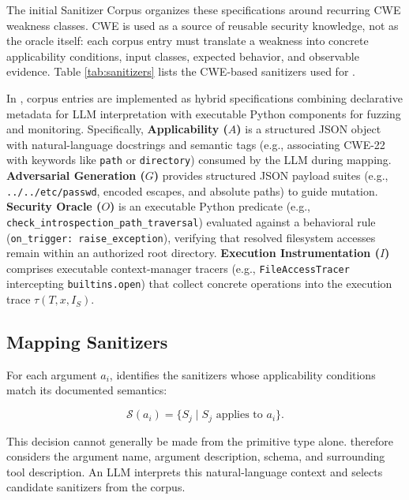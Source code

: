 The initial Sanitizer Corpus organizes these specifications around recurring
CWE weakness classes. CWE is used as a source of reusable security knowledge,
not as the oracle itself: each corpus entry must translate a weakness into
concrete applicability conditions, input classes, expected behavior, and
observable evidence. Table \ref{tab:sanitizers} lists the CWE-based sanitizers used for \project{}. 

In \project{}, corpus entries are implemented as hybrid specifications combining declarative metadata for LLM interpretation with executable Python components for fuzzing and monitoring. Specifically, \textbf{Applicability ($A$)} is a structured JSON object with natural-language docstrings and semantic tags (e.g., associating CWE-22 with keywords like \texttt{path} or \texttt{directory}) consumed by the LLM during mapping. \textbf{Adversarial Generation ($G$)} provides structured JSON payload suites (e.g., \texttt{../../etc/passwd}, encoded escapes, and absolute paths) to guide mutation. \textbf{Security Oracle ($O$)} is an executable Python predicate (e.g., \texttt{check\_introspection\_path\_traversal}) evaluated against a behavioral rule (\texttt{on\_trigger: raise\_exception}), verifying that resolved filesystem accesses remain within an authorized root directory. \textbf{Execution Instrumentation ($I$)} comprises executable context-manager tracers (e.g., \texttt{FileAccessTracer} intercepting \texttt{builtins.open}) that collect concrete operations into the execution trace $\tau(T, x, I_S)$.

\subsection{Mapping Sanitizers}
\label{sec:design-specialization}

For each argument $a_i$, \project{} identifies the sanitizers whose
applicability conditions match its documented semantics:

\[
\mathcal{S}(a_i)=
\{S_j \mid S_j \text{ applies to } a_i\}.
\]

This decision cannot generally be made from the primitive type alone.
\project{} therefore considers the argument name, argument description,
schema, and surrounding tool description. An LLM interprets this
natural-language context and selects candidate sanitizers from the corpus.

